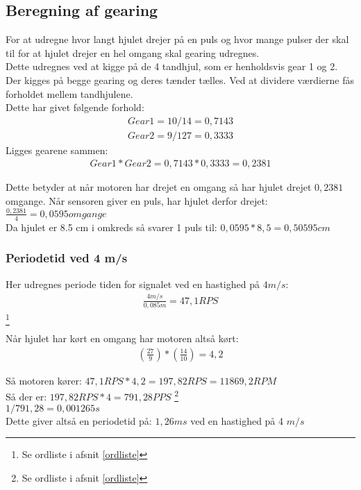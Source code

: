\subsection{Beregning af gearing}
\label{beregn_gear}

For at udregne hvor langt hjulet drejer på en puls og hvor mange pulser der skal til for at hjulet drejer en hel omgang skal gearing udregnes. \\
Dette udregnes ved at kigge på de 4 tandhjul, som er henholdsvis gear 1 og 2. Der kigges på begge gearing og deres tænder tælles. Ved at dividere værdierne fås forholdet mellem tandhjulene. \\
Dette har givet følgende forhold:
\begin{align*}
Gear1 = 10 / 14 = 0,7143 \\
Gear2 = 9 / 127 = 0,3333
\end{align*}
Ligges gearene sammen:
\begin{align*}
Gear1*Gear2 = 0,7143 * 0,3333 = 0,2381
\end{align*}

Dette betyder at når motoren har drejet en omgang så har hjulet drejet \(0,2381\) omgange.
Når sensoren giver en puls, har hjulet derfor drejet: \(\frac{0,2381}{4} = 0,0595 omgange\) \\
Da hjulet er 8.5 cm i omkreds så svarer 1 puls til: \(0,0595*8,5 = 0,50595 cm\)

\subsubsection{Periodetid ved 4 m/s}
\label{periode_4ms}
Her udregnes periode tiden for signalet ved en hastighed på $4 m/s$:
\begin{align*}
\frac{4m/s}{0,085m} = 47,1 RPS
\end{align*}
\footnote{Se ordliste i afsnit \ref{ordliste}}

Når hjulet har kørt en omgang har motoren altså kørt:
\begin{align*}
(\frac{27}{9}) * (\frac{14}{10}) = 4,2
\end{align*}

Så motoren kører: \(47,1 RPS * 4,2 = 197,82 RPS = 11869,2 RPM \) \\
Så der er: \(197,82 RPS *4 = 791,28 PPS \) \footnote{Se ordliste i afsnit \ref{ordliste}} \\
\(1/791,28 = 0,001265 s \) \\
Dette giver altså en periodetid på: \(1,26 ms\) ved en hastighed på 4 $m/s$
